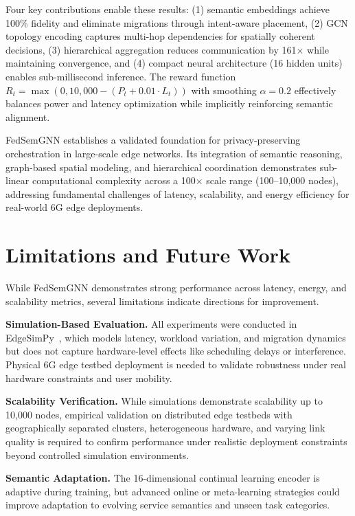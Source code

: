 \documentclass[conference]{IEEEtran}
\begin{document}
		Four key contributions enable these results: (1) semantic embeddings achieve 100\% fidelity and eliminate migrations through intent-aware placement, (2) GCN topology encoding captures multi-hop dependencies for spatially coherent decisions, (3) hierarchical aggregation reduces communication by 161$\times$ while maintaining convergence, and (4) compact neural architecture (16 hidden units) enables sub-millisecond inference. The reward function $R_t = \max(0, 10{,}000 - (P_t + 0.01 \cdot L_t))$ with smoothing $\alpha = 0.2$ effectively balances power and latency optimization while implicitly reinforcing semantic alignment.
		
		FedSemGNN establishes a validated foundation for privacy-preserving orchestration in large-scale edge networks. Its integration of semantic reasoning, graph-based spatial modeling, and hierarchical coordination demonstrates sub-linear computational complexity across a 100$\times$ scale range (100--10,000 nodes), addressing fundamental challenges of latency, scalability, and energy efficiency for real-world 6G edge deployments.
		
		
		\section{Limitations and Future Work}
		\label{sec:limitations_future}
		
		While FedSemGNN demonstrates strong performance across latency, energy, and scalability metrics, several limitations indicate directions for improvement.
		
		\textbf{Simulation-Based Evaluation.} All experiments were conducted in EdgeSimPy~\cite{souza2023edgesimpy}, which models latency, workload variation, and migration dynamics but does not capture hardware-level effects like scheduling delays or interference. Physical 6G edge testbed deployment is needed to validate robustness under real hardware constraints and user mobility.
		
		\textbf{Scalability Verification.} While simulations demonstrate scalability up to 10,000 nodes, empirical validation on distributed edge testbeds with geographically separated clusters, heterogeneous hardware, and varying link quality is required to confirm performance under realistic deployment constraints beyond controlled simulation environments.
		
		\textbf{Semantic Adaptation.} The 16-dimensional continual learning encoder is adaptive during training, but advanced online or meta-learning strategies could improve adaptation to evolving service semantics and unseen task categories.
		
\end{document}

